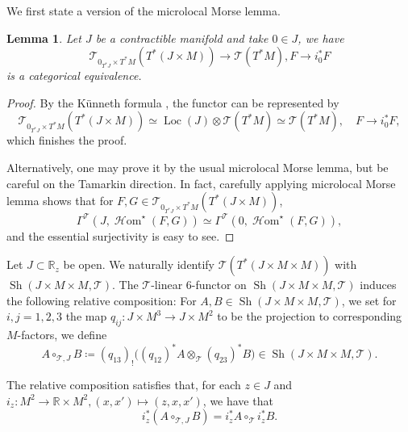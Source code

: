 \documentclass[11pt]{amsart}
\numberwithin{equation}{section}
\theoremstyle{plain}
\newtheorem{Lemma}[lemma]{Lemma}
\theoremstyle{definition}
\theoremstyle{remark}
\newcommand{\bR} { {\mathbb{R}}}
\newcommand{\sT} { {\mathscr{T}}}
\newcommand{\Sh} { {\operatorname{Sh}}}
\newcommand\Loc{ {\operatorname{Loc}} }
\newcommand\sHom{\operatorname{\mathscr{H}om}}
\begin{document}
We first state a version of the microlocal Morse lemma.
\begin{Lemma}\label{lemma: microlocal morse-Tamarkin}Let $J$ be a contractible manifold and take $0\in J$, we have \[  \sT_{0_{T^*J}\times T^*M }(T^*(J\times M) )\to \sT(T^*M), F\to i^*_0F\] is a categorical equivalence.    
\end{Lemma}
\begin{proof}By the Künneth formula \cite{zhang-cutoff}, the functor can be represented by 
 \[\sT_{0_{T^*J}\times T^*M }(T^*(J\times M) )\simeq\Loc(J) \otimes  \sT(T^*M) \simeq \sT(T^*M) ,\quad F\to i^*_0F,\] 
 which finishes the proof.

Alternatively, one may prove it by the usual microlocal Morse lemma, but be careful on the Tamarkin direction. In fact, carefully applying microlocal Morse lemma shows that for $F, G \in \sT_{0_{T^*J}\times T^*M }(T^*(J\times M) )$,
\[\Gamma^\sT(J, \sHom^\star(F, G)) \simeq \Gamma^\sT(0, \sHom^\star(F, G)),\]
and the essential surjectivity is easy to see.
\end{proof}

Let $J\subset \bR_z$ be open. We naturally identify $\sT(T^*(J\times M\times M))$ with $\Sh(J\times M\times M,\sT)$. The $\sT$-linear 6-functor on $\Sh(J\times M\times M,\sT)$ induces the following relative composition: For $A, B\in \Sh(J\times M\times M,\sT)$, we set for $i,j=1,2,3$ the map $q_{ij}:J\times M^3\to J\times M^2$ to be the projection to corresponding $M$-factors, we define
\[A\circ_{\sT,J} B\coloneqq (q_{13})_!
\bigl(
(q_{12})^*A
\otimes_{\sT}
(q_{23})^*B
\bigr)\in \Sh(J\times M\times M,\sT).\]

The relative composition satisfies that, for each $z\in J$ and $i_z:M^2\to \bR\times M^2 ,(x, x') \mapsto (z,x,x' )$, we have that 
\[i_z^*(A\circ_{\sT,J} B)=i_z^* A\circ_{\sT}i_z^*B.\]
\end{document}
